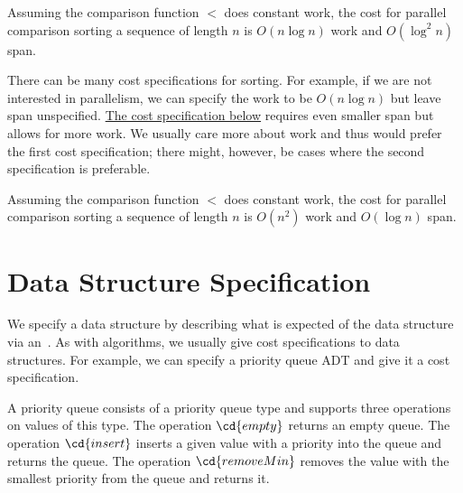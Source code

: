 \begin{costspec}
\label{cost:intro::spec::sorting-efficient}
Assuming the comparison function $<$ does constant work, the cost for
parallel comparison sorting a sequence of length $n$ is $O(n \log n)$
work and $O(\log^2 n)$ span.
\end{costspec}

\begin{gram}
There can be many cost specifications for sorting.  For example, if we
are not interested in parallelism, we can specify the work to be $O(n
\log{n})$ but leave span unspecified. 
%
\href{cost:intro::spec::sorting-inefficient}{The cost specification below}
%
requires even smaller span but allows for more work.
%
We usually care more about work and thus would prefer the first cost
specification; there might, however, be cases where the second
specification is preferable.
\end{gram}

\begin{costspec}
\label{cost:intro::spec::sorting-inefficient}
Assuming the comparison function $<$ does constant work, the cost for
parallel comparison sorting a sequence of length $n$ is $O(n^2)$ work
and $O(\log n)$ span.
\end{costspec}
%

\section{Data Structure Specification}
\begin{gram}
We specify a data structure by describing what is expected of the data
structure via an~.
%
As with algorithms, we usually give cost specifications to data
structures.
%
For example, we can specify a priority queue ADT and give it a cost
specification. 
%
\end{gram}

\begin{datatype}
A priority queue consists of a priority queue type and supports three
operations on values of this type.  The operation $\cd{empty}$ returns
an empty queue.  The operation $\cd{insert}$ inserts a given value with
a priority into the queue and returns the queue.  The operation
$\cd{removeMin}$ removes the value with the smallest priority from the
queue and returns it.
\end{datatype}

